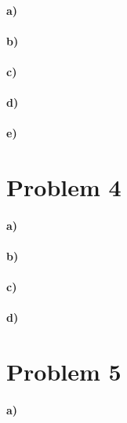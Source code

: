 \documentclass[12pt]{article}
\begin{document}
\paragraph{a)}

\paragraph{b)}

\paragraph{c)}

\paragraph{d)}

\paragraph{e)}

\section*{Problem 4}

\paragraph{a)}

\paragraph{b)}

\paragraph{c)}

\paragraph{d)}

\section*{Problem 5}

\paragraph{a)}
\end{document}
